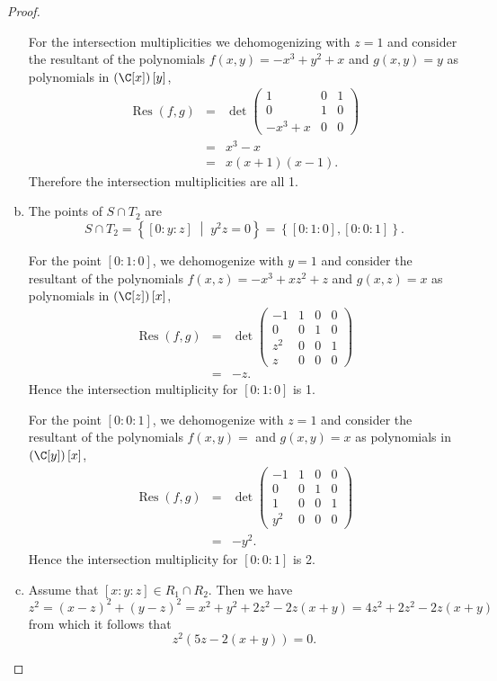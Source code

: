 \documentclass[10pt]{amsart}
\begin{document}
\begin{thm}
\begin{proof}
\begin{enumerate}[(a)]
      For the intersection multiplicities we dehomogenizing with $z = 1$ and consider the resultant of the polynomials $f(x,y) = -x^{3} + y^{2} + x$ and $g(x,y) = y$ as polynomials in $\left(\C[x]\right)[y]$,
      \begin{eqnarray*}
        \operatorname{Res}(f,g) &=& \det \left(\begin{array}{ccc}
          1 & 0 & 1 \\
          0 & 1 & 0 \\
          -x^{3} + x & 0 & 0
        \end{array}\right)\\
        &=& x^3 - x\\
        &=& x(x+1)(x-1).
      \end{eqnarray*}
      Therefore the intersection multiplicities are all 1.
    \item
      The points of $S \cap T_2$ are
      $$S \cap T_2 = \left\{ [0 : y : z] \;\middle\vert\; y^2z = 0 \right\} = \left\{[0 : 1 : 0], [0 : 0 : 1]\right\}.$$
      
      For the point $[0 : 1 : 0]$, we dehomogenize with $y = 1$ and consider the resultant of the polynomials $f(x,z) = -x^{3} + x z^{2} + z$ and $g(x,z) = x$ as polynomials in $\left(\C[z]\right)[x]$,
      \begin{eqnarray*}
        \operatorname{Res}(f,g) &=& \det\left(\begin{array}{cccc}
          -1 & 1 & 0 & 0 \\
          0 & 0 & 1 & 0 \\
          z^{2} & 0 & 0 & 1 \\
          z & 0 & 0 & 0
        \end{array}\right)\\
        &=& -z.
      \end{eqnarray*}
      Hence the intersection multiplicity for $[0 : 1 : 0]$ is 1.
      
      For the point $[0 : 0 : 1]$, we dehomogenize with $z = 1$ and consider the resultant of the polynomials $f(x,y) = $ and $g(x,y) = x$ as polynomials in $\left(\C[y]\right)[x]$,
      \begin{eqnarray*}
        \operatorname{Res}(f,g) &=& \det \left(\begin{array}{cccc}
          -1 & 1 & 0 & 0 \\
          0 & 0 & 1 & 0 \\
          1 & 0 & 0 & 1 \\
          y^{2} & 0 & 0 & 0
        \end{array}\right)\\
        &=& -y^2.
      \end{eqnarray*}
      Hence the intersection multiplicity for $[0 : 0 : 1]$ is 2.
    \item
      Assume that $[x : y : z] \in R_1 \cap R_2$.
      Then we have
      $$z^2 = (x - z)^2 + (y - z)^2 = x^2 + y^2 + 2z^2 - 2z(x + y) = 4z^2 + 2z^2 - 2z(x + y)$$
      from which it follows that
      $$z^2(5z - 2(x + y)) = 0.$$
      

\end{enumerate}
\end{proof}
\end{thm}
\end{document}
